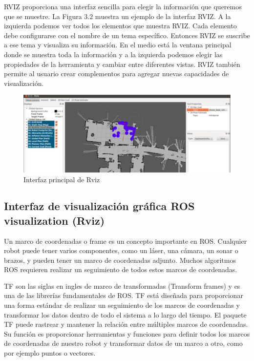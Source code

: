         RVIZ proporciona una interfaz sencilla para elegir la información que queremos que se muestre. La Figura 3.2 muestra un ejemplo de la interfaz RVIZ. A la izquierda podemos ver todos los elementos que muestra RVIZ. Cada elemento debe configurarse con el nombre de un tema específico. Entonces RVIZ se suscribe a ese tema y visualiza su información. En el medio está la ventana principal donde se muestra toda la información y a la izquierda podemos elegir las propiedades de la herramienta y cambiar entre diferentes vistas. RVIZ también permite al usuario crear complementos para agregar nuevas capacidades de visualización.
        
        \begin{figure}[htb]
            \centering
            \includegraphics[width=0.8\linewidth]{Main/Chapter3/Images3/3-6/interfaz-rviz.png}
            \caption{Interfaz principal de Rviz}
            \label{f:Cap3-6_interfaz_rviz}
        \end{figure}
    
    \subsection{Interfaz de visualización gráfica ROS visualization (Rviz)}
    
        Un marco de coordenadas o frame es un concepto importante en ROS. Cualquier robot puede tener varios componentes, como un láser, una cámara, un sonar o brazos, y pueden tener un marco de coordenadas adjunto. Muchos algoritmos ROS requieren realizar un seguimiento de todos estos marcos de coordenadas.
        
        TF son las siglas en ingles de marco de transformadas (Transform frames) y es una de las librerías fundamentales de ROS. TF está diseñada para proporcionar una forma estándar de realizar un seguimiento de los marcos de coordenadas y transformar los datos dentro de todo el sistema a lo largo del tiempo. El paquete TF puede rastrear y mantener la relación entre múltiples marcos de coordenadas. Su función es proporcionar herramientas y funciones para definir todos los marcos de coordenadas de nuestro robot y transformar datos de un marco a otro, como por ejemplo puntos o vectores.
        
